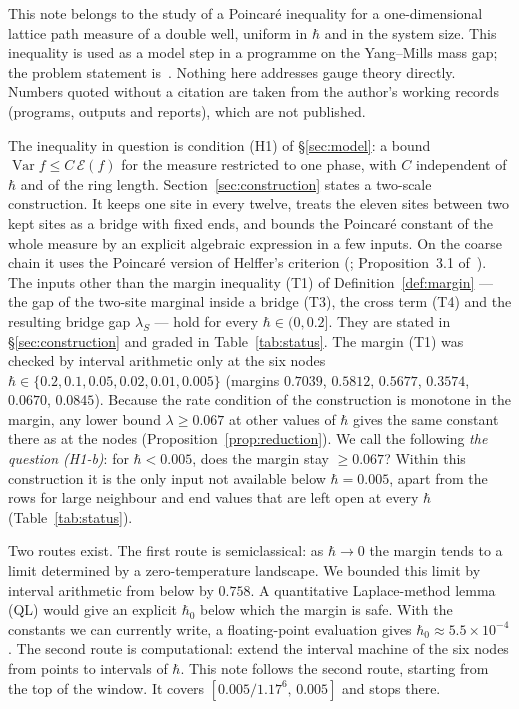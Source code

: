 \documentclass[11pt,a4paper]{article}
\theoremstyle{definition}
\theoremstyle{remark}
\DeclareMathOperator{\Var}{Var}
\begin{document}
{\sloppy This note belongs to the study of a Poincaré inequality for a one-dimensional lattice path measure of a double well, uniform in $\hbar$ and in the system size. This inequality is used as a model step in a programme on the Yang--Mills mass gap; the problem statement is~\cite{JW}. Nothing here addresses gauge theory directly. Numbers quoted without a citation are taken from the author's working records (programs, outputs and reports), which are not published.\par}

The inequality in question is condition (H1) of \S\ref{sec:model}: a bound $\Var f\le C\,\mathcal E(f)$ for the measure restricted to one phase, with $C$ independent of $\hbar$ and of the ring length. Section~\ref{sec:construction} states a two-scale construction. It keeps one site in every twelve, treats the eleven sites between two kept sites as a bridge with fixed ends, and bounds the Poincaré constant of the whole measure by an explicit algebraic expression in a few inputs. On the coarse chain it uses the Poincaré version of Helffer's criterion (\cite{He}; Proposition~3.1 of~\cite{Le}). The inputs other than the margin inequality (T1) of Definition~\ref{def:margin} --- the gap of the two-site marginal inside a bridge (T3), the cross term (T4) and the resulting bridge gap $\lambda_S$ --- hold for every $\hbar\in(0,0.2]$. They are stated in \S\ref{sec:construction} and graded in Table~\ref{tab:status}. The margin (T1) was checked by interval arithmetic only at the six nodes $\hbar\in\{0.2,0.1,0.05,0.02,0.01,0.005\}$ (margins $0.7039$, $0.5812$, $0.5677$, $0.3574$, $0.0670$, $0.0845$). Because the rate condition of the construction is monotone in the margin, any lower bound $\lambda\ge0.067$ at other values of $\hbar$ gives the same constant there as at the nodes (Proposition~\ref{prop:reduction}). We call the following \emph{the question (H1-b)}: for $\hbar<0.005$, does the margin stay $\ge0.067$? Within this construction it is the only input not available below $\hbar=0.005$, apart from the rows for large neighbour and end values that are left open at every $\hbar$ (Table~\ref{tab:status}).

Two routes exist. The first route is semiclassical: as $\hbar\to0$ the margin tends to a limit determined by a zero-temperature landscape. We bounded this limit by interval arithmetic from below by $0.758$. A quantitative Laplace-method lemma (QL) would give an explicit $\hbar_0$ below which the margin is safe. With the constants we can currently write, a floating-point evaluation gives $\hbar_0\approx5.5\times10^{-4}$. The second route is computational: extend the interval machine of the six nodes from points to intervals of $\hbar$. This note follows the second route, starting from the top of the window. It covers $[0.005/1.17^6,\,0.005]$ and stops there.
\end{document}
